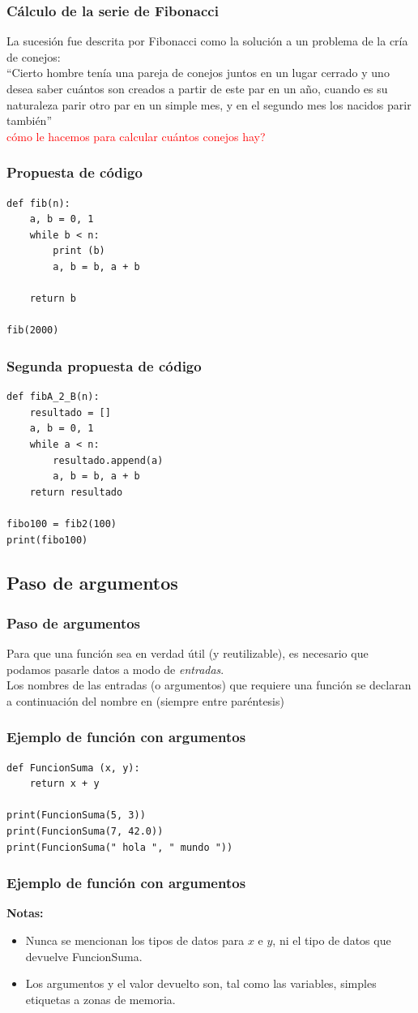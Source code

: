 \begin{frame}
\frametitle{Cálculo de la serie de Fibonacci}
La sucesión fue descrita por Fibonacci como la solución a un problema de la cría de conejos: 
\\
\bigskip
\enquote{Cierto hombre tenía una pareja de conejos juntos en un lugar cerrado y uno desea saber cuántos son creados a partir de este par en un año, cuando es su naturaleza parir otro par en un simple mes, y en el segundo mes los nacidos parir también}
\\
\bigskip
\pause
\textcolor{red}{cómo le hacemos para calcular cuántos conejos hay?}
\end{frame}
\begin{frame}[fragile]
\frametitle{Propuesta de código}
\begin{lstlisting}[style=codigopython]
def fib(n):
    a, b = 0, 1
    while b < n:
        print (b)
        a, b = b, a + b
    
    return b

fib(2000)
\end{lstlisting}
\end{frame}
\begin{frame}[fragile]
\frametitle{Segunda propuesta de código}
\begin{lstlisting}[style=codigopython]
def fibA_2_B(n):
    resultado = []
    a, b = 0, 1
    while a < n:
        resultado.append(a)
        a, b = b, a + b
    return resultado

fibo100 = fib2(100)
print(fibo100)
\end{lstlisting}
\end{frame}
\subsection{Paso de argumentos}
\begin{frame}[fragile]
\frametitle{Paso de argumentos}
Para que una función sea en verdad útil (y reutilizable), es necesario que podamos pasarle datos a modo de \emph{entradas}. 
\\
\bigskip
Los nombres de las entradas (o argumentos) que requiere una función se declaran a continuación del nombre en  (siempre entre paréntesis)
\end{frame}
\begin{frame}[fragile]
\frametitle{Ejemplo de función con argumentos}
\begin{lstlisting}
def FuncionSuma (x, y):
    return x + y

print(FuncionSuma(5, 3))
print(FuncionSuma(7, 42.0))
print(FuncionSuma(" hola ", " mundo "))
\end{lstlisting}
\end{frame}
\begin{frame}[fragile]
\frametitle{Ejemplo de función con argumentos}
\textbf{Notas:} 
\begin{itemize}[<+->]
\item Nunca se mencionan los tipos de datos para $x$ e $y$, ni el tipo de datos que devuelve FuncionSuma.
\item Los argumentos y el valor devuelto son, tal como las variables, simples etiquetas a zonas de memoria.
\end{itemize}  
\end{frame}
